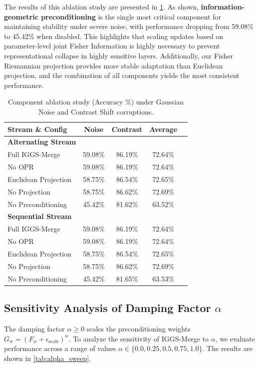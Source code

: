 \documentclass{article}
\theoremstyle{plain}
\theoremstyle{definition}
\theoremstyle{remark}
\begin{document}
The results of this ablation study are presented in \cref{tab:ablation}. As shown, \textbf{information-geometric preconditioning} is the single most critical component for maintaining stability under severe noise, with performance dropping from 59.08\% to 45.42\% when disabled. This highlights that scaling updates based on parameter-level joint Fisher Information is highly necessary to prevent representational collapse in highly sensitive layers. Additionally, our Fisher Riemannian projection provides more stable adaptation than Euclidean projection, and the combination of all components yields the most consistent performance.

\begin{table}[h]
\caption{Component ablation study (Accuracy \%) under Gaussian Noise and Contrast Shift corruptions.}
\label{tab:ablation}
\vskip 0.1in
\begin{center}
\begin{footnotesize}
\begin{tabular}{lcccc}
\toprule
Stream \& Config & Noise & Contrast & Average \\
\midrule
\textbf{Alternating Stream} & & & \\
Full IGGS-Merge & 59.08\% & 86.19\% & 72.64\% \\
No OPR & 59.08\% & 86.19\% & 72.64\% \\
Euclidean Projection & 58.75\% & 86.54\% & 72.65\% \\
No Projection & 58.75\% & 86.62\% & 72.69\% \\
No Preconditioning & 45.42\% & 81.62\% & 63.52\% \\
\midrule
\textbf{Sequential Stream} & & & \\
Full IGGS-Merge & 59.08\% & 86.19\% & 72.64\% \\
No OPR & 59.08\% & 86.19\% & 72.64\% \\
Euclidean Projection & 58.75\% & 86.54\% & 72.65\% \\
No Projection & 58.75\% & 86.62\% & 72.69\% \\
No Preconditioning & 45.42\% & 81.65\% & 63.53\% \\
\bottomrule
\end{tabular}
\end{footnotesize}
\end{center}
\vskip -0.1in
\end{table}

\subsection{Sensitivity Analysis of Damping Factor $\alpha$}
The damping factor $\alpha \geq 0$ scales the preconditioning weights $G_w = (F_w + \epsilon_{\text{scale}})^\alpha$. To analyze the sensitivity of IGGS-Merge to $\alpha$, we evaluate performance across a range of values $\alpha \in \{0.0, 0.25, 0.5, 0.75, 1.0\}$. The results are shown in \cref{tab:alpha_sweep}.
\end{document}
